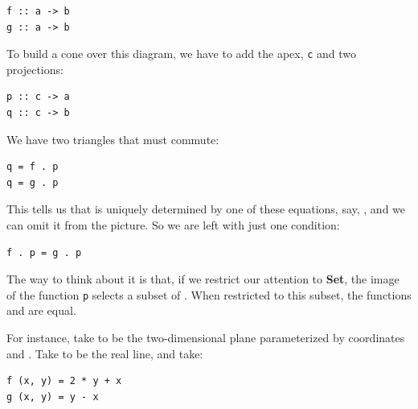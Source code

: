 \begin{verbatim}
f :: a -> b 
g :: a -> b
\end{verbatim}

To build a cone over this diagram, we have to add the apex, \texttt{c}
and two projections:

\begin{verbatim}
p :: c -> a 
q :: c -> b
\end{verbatim}

\begin{figure}[H]
    \centering
\end{figure}

We have two triangles that must commute:

\begin{verbatim}
q = f . p 
q = g . p
\end{verbatim}

This tells us that  is uniquely determined by one of these
equations, say, , and we can omit it from the
picture. So we are left with just one condition:

\begin{verbatim}
f . p = g . p
\end{verbatim}

The way to think about it is that, if we restrict our attention to
\textbf{Set}, the image of the function \texttt{p} selects a subset of
. When restricted to this subset, the functions  and
 are equal.

For instance, take  to be the two-dimensional plane
parameterized by coordinates  and . Take 
to be the real line, and take:

\begin{verbatim}
f (x, y) = 2 * y + x 
g (x, y) = y - x
\end{verbatim}

